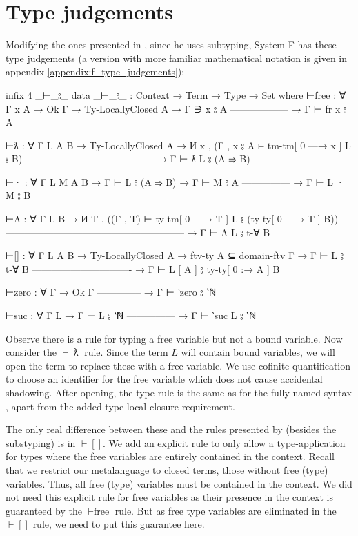 \documentclass[logo,bsc,singlespacing,parskip,online]{infthesis}
\DeclareMathOperator{\lambdabar}{\text{ƛ}}
\begin{document}
\section{Type judgements}
\label{chapter3:type_judgements}
Modifying the ones presented in \citet{chargueraud_locally_2012}, since he uses subtyping, System F
has these type judgements (a version with more familiar mathematical notation is given in appendix \ref{appendix:f_type_judgements}):
\begin{code}
  infix  4 _⊢_⦂_
  data _⊢_⦂_ : Context → Term → Type → Set where
    ⊢free : ∀ {Γ x A}
      → Ok Γ
      → Ty-LocallyClosed A
      → Γ ∋ x ⦂ A
        ------------------
      → Γ ⊢ fr x ⦂ A

    ⊢ƛ : ∀ {Γ L A B}
      → Ty-LocallyClosed A
      → И x , (Γ , x ⦂ A ⊢ tm-tm[ 0 —→ x ] L ⦂ B)
        ----------------------------------------
      → Γ ⊢ ƛ L ⦂ (A ⇒ B)

    ⊢· : ∀ {Γ L M A B}
      → Γ ⊢ L ⦂ (A ⇒ B)
      → Γ ⊢ M ⦂ A
        ---------------
      → Γ ⊢ L · M ⦂ B

    ⊢Λ : ∀ {Γ L B}
      → И T , ((Γ , T) ⊢ ty-tm[ 0 —→ T ] L ⦂ (ty-ty[ 0 —→ T ] B))
        --------------------------------------------------------
      → Γ ⊢ Λ L ⦂ t-∀ B

    ⊢[] : ∀ {Γ L A B}
      → Ty-LocallyClosed A
      → ftv-ty A ⊆ domain-ftv Γ
      → Γ ⊢ L ⦂ t-∀ B
        -------------------------------
      → Γ ⊢ L [ A ] ⦂ ty-ty[ 0 :→ A ] B

    ⊢zero : ∀ {Γ}
      → Ok Γ
        --------------
      → Γ ⊢ ‵zero ⦂ ‵ℕ

    ⊢suc : ∀ {Γ L}
      → Γ ⊢ L ⦂ ‵ℕ
        ---------------
      → Γ ⊢ ‵suc L ⦂ ‵ℕ
\end{code}

Observe there is a rule for typing a free variable but not a bound variable. Now consider the
$\vdash\lambdabar$ rule. Since the term $L$ will contain bound variables, we will open the term to
replace these with a free variable. We use cofinite quantification to choose an identifier for the
free variable which does not cause accidental shadowing. After opening, the type rule is the same as
for the fully named syntax \citep[chapter~Lambda]{wadler_programming_2022}, apart from the added
type local closure requirement.

The only real difference between these and the rules presented by \citet{chargueraud_locally_2012}
(besides the substyping) is in $\vdash[]$. We add an explicit rule to only allow a type-application
for types where the free variables are entirely contained in the context. Recall that we restrict
our metalanguage to closed terms, those without free (type) variables. Thus, all free (type)
variables must be contained in the context. We did not need this explicit rule for free variables as
their presence in the context is guaranteed by the $\vdash\text{free}$ rule. But as free type
variables are eliminated in the $\vdash[]$ rule, we need to put this guarantee here.
\end{document}
